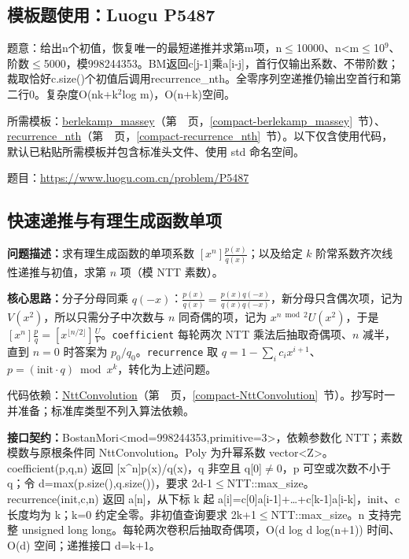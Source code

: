 \Needspace{459pt}

\subsection*{模板题使用：Luogu P5487}

\label{usage-example-160}

题意：给出n个初值，恢复唯一的最短递推并求第m项，n$\le$10000、n<m$\le$10$^{9}$、阶数$\le$5000，模998244353。BM返回c[j-1]乘a[i-j]，首行仅输出系数、不带阶数；裁取恰好c.size()个初值后调用recurrence\_nth。全零序列空递推仍输出空首行和第二行0。复杂度O(nk+k$^{2}$log m)，O(n+k)空间。

所需模板：\hyperref[compact-berlekamp_massey]{berlekamp\_\allowbreak{}massey}（第~\pageref{compact-berlekamp_massey}~页，\ref{compact-berlekamp_massey}~节）、\hyperref[compact-recurrence_nth]{recurrence\_\allowbreak{}nth}（第~\pageref{compact-recurrence_nth}~页，\ref{compact-recurrence_nth}~节）。以下仅含使用代码，默认已粘贴所需模板并包含标准头文件、使用 std 命名空间。

题目：\url{https://www.luogu.com.cn/problem/P5487}



\subsection{快速递推与有理生成函数单项}\label{compact-BostanMori}

\noindent\textbf{问题描述：}\allowbreak 求有理生成函数的单项系数 $[x^n]\frac{p(x)}{q(x)}$；以及给定 $k$ 阶常系数齐次线性递推与初值，求第 $n$ 项（模 NTT 素数）。

\textbf{核心思路：}\allowbreak 分子分母同乘 $q(-x)$：$\frac{p(x)}{q(x)}=\frac{p(x)q(-x)}{q(x)q(-x)}$，新分母只含偶次项，记为 $V(x^2)$，所以只需分子中次数与 $n$ 同奇偶的项，记为 $x^{n\bmod 2}U(x^2)$，于是 $[x^n]\frac pq=[x^{\lfloor n/2\rfloor}]\frac{U}{V}$。\texttt{coefficient} 每轮两次 NTT 乘法后抽取奇偶项、$n$ 减半，直到 $n=0$ 时答案为 $p_0/q_0$。\texttt{recurrence} 取 $q=1-\sum_i c_ix^{i+1}$、$p=(\mathrm{init}\cdot q)\bmod x^k$，转化为上述问题。

代码依赖：\hyperref[compact-NttConvolution]{NttConvolution}（第~\pageref{compact-NttConvolution}~页，\ref{compact-NttConvolution}~节）。抄写时一并准备；标准库类型不列入算法依赖。

{\sloppy{}\noindent\textbf{接口契约：}BostanMori<mod=998244353,primitive=3>，依赖参数化 NTT；素数模数与原根条件同 NttConvolution。Poly 为升幂系数 vector<Z>。coefficient(p,q,n) 返回 [x\textasciicircum{}n]p(x)/q(x)，q 非空且 q[0]$\ne$0，p 可空或次数不小于 q；令 d=max(p.size(),q.size())，要求 2d-1$\le$NTT::max\_size。recurrence(init,c,n) 返回 a[n]，从下标 k 起 a[i]=c[0]a[i-1]+…+c[k-1]a[i-k]，init、c 长度均为 k；k=0 约定全零。非初值查询要求 2k+1$\le$NTT::max\_size。n 支持完整 unsigned long long。每轮两次卷积后抽取奇偶项，O(d log d log(n+1)) 时间、O(d) 空间；递推接口 d=k+1。\par}

